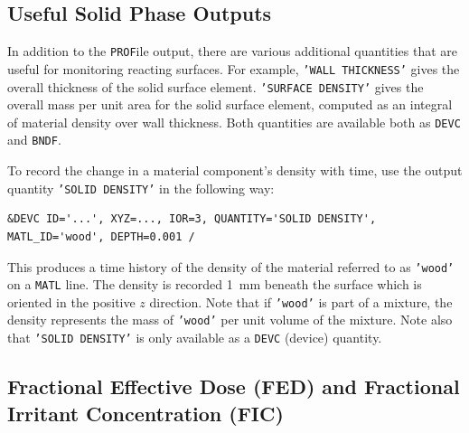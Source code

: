 \documentclass[11pt]{book}
\newcommand{\ct}{\tt\small}
\begin{document}
\subsection{Useful Solid Phase Outputs}
\label{info:material_components}

In addition to the {\ct PROF}ile output, there are various additional quantities that are useful for monitoring reacting
surfaces. For example, {\ct 'WALL THICKNESS'} gives the overall thickness of the solid surface
element. {\ct 'SURFACE DENSITY'} gives the overall mass per unit area for the
solid surface element, computed as an integral of material density over wall
thickness. Both quantities are available both as {\ct DEVC} and {\ct BNDF}.

To record the change in a material
component's density with time, use the output quantity {\ct 'SOLID DENSITY'} in the following way:

\footnotesize
\begin{verbatim}
&DEVC ID='...', XYZ=..., IOR=3, QUANTITY='SOLID DENSITY', MATL_ID='wood', DEPTH=0.001 /
\end{verbatim} \normalsize

\noindent
This produces a time history of the density of the material referred to as {\ct 'wood'} on a {\ct MATL} line. The density
is recorded 1~mm beneath the surface which is oriented in the positive $z$ direction. Note that if {\ct 'wood'} is part of a mixture, the
density represents the mass of {\ct 'wood'} per unit volume of the mixture. Note also that {\ct 'SOLID DENSITY'} is only available as a
{\ct DEVC} (device) quantity.

\subsection{Fractional Effective Dose (FED) and Fractional Irritant Concentration (FIC)}
\label{info:FED}
\end{document}
